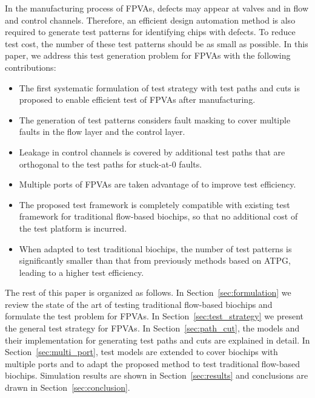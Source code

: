 In the manufacturing process of FPVAs, defects may appear 
at valves and in flow and control channels.
%
Therefore, 
an efficient design automation method is also required to generate test patterns
for identifying chips with defects. To reduce test cost, the number of these test
patterns should be as small as possible.
In this paper, we address this test generation problem for FPVAs 
with the following contributions:

\begin{itemize}

\item The first systematic formulation of test strategy with test paths and cuts 
  is proposed to enable efficient test of FPVAs after manufacturing.

\item The generation of test patterns
  considers fault masking 
  to cover multiple faults in the flow layer and the control layer.

\item Leakage in control channels is covered by additional test
  paths that are orthogonal to the test paths for stuck-at-0 faults.
  
\item Multiple ports of FPVAs are taken advantage of to improve test
  efficiency. 
  
\item The proposed test framework is completely compatible with existing test
  framework for traditional flow-based biochips,
  so that no additional cost of the test platform is incurred. 
  
\item  When adapted to test traditional biochips, the number of test patterns
  is significantly smaller than that from previously methods based on ATPG, leading
  to a higher test efficiency.

\end{itemize}


The rest of this paper is organized as follows. In
Section~\ref{sec:formulation} we review the state of the art of
testing traditional flow-based biochips and formulate the test problem for FPVAs.
In Section~\ref{sec:test_strategy} we present the general test strategy 
for FPVAs. 
In Section~\ref{sec:path_cut}, the models and their implementation for generating test paths and cuts
are explained in detail.
In Section~\ref{sec:multi_port}, test models are extended to cover biochips
with multiple ports and to adapt the proposed method to test traditional flow-based biochips.
Simulation results are shown in Section~\ref{sec:results} and
conclusions are drawn in Section~\ref{sec:conclusion}.

